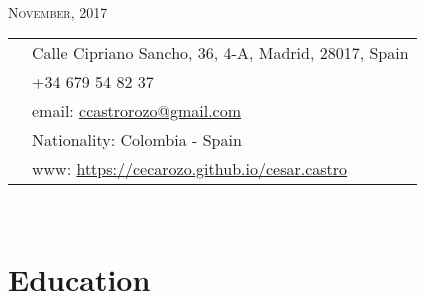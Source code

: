 \documentclass[11pt]{article}\usepackage[]{graphicx}\usepackage[]{color}
\begin{document}
\par{\\
\vspace{5pt}
{\color{headings} \scshape{November, 2017}}\\
\vspace{10pt}}

\colorbox{shade}{{
\begin{tabular}{c|p{13cm}}
\vspace{5pt}\raisebox{-4pt}{\textifsymbol{18}} & Calle Cipriano Sancho, 36, 4-A, Madrid, 28017, Spain\\
\vspace{5pt}\raisebox{-4pt}{\Mobilefone} & +34 679 54 82 37\\
\vspace{5pt}\raisebox{-4pt}{\Letter} & email: \href{mailto:ccastrorozo@gmail.com}{ccastrorozo@gmail.com} \\
\vspace{5pt}\raisebox{-4pt}{\Aquarius} & Nationality: Colombia - Spain\\
\vspace{5pt}\raisebox{-4pt}{\Mundus} & www: \href{https://cecarozo.github.io/cesar.castro}{https://cecarozo.github.io/cesar.castro}\\
\end{tabular}
}
}\\[10pt]


\section{Education} 
\end{document}
